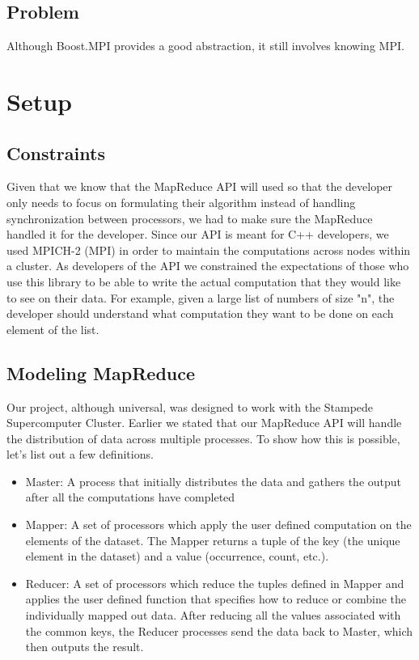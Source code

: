 \documentclass[11pt]{article}
\begin{document}
\subsection{Problem}
Although Boost.MPI provides a good abstraction, it still involves knowing MPI. 

\section{Setup}
\subsection{Constraints}
Given that we know that the MapReduce API will used so that the developer only needs to focus on formulating their algorithm instead of handling synchronization between processors, we had to make sure the MapReduce handled it for the developer. Since our API is meant for C++ developers, we used MPICH-2 (MPI) in order to maintain the computations across nodes within a cluster. As developers of the API we constrained the expectations of those who use this library to be able to write the actual computation that they would like to see on their data. For example, given a large list of numbers of size "n", the developer should understand what computation they want to be done on each element of the list. 
\subsection{Modeling MapReduce}
Our project, although universal, was designed to work with the Stampede Supercomputer Cluster. Earlier we stated that our MapReduce API will handle the distribution of data across multiple processes. To show how this is possible, let's list out a few definitions.
\begin{itemize}
  \item Master: A process that initially distributes the data and gathers the output after all the computations have completed
  \item Mapper: A set of processors which apply the user defined computation on the elements of the dataset. The Mapper returns a tuple of the key (the unique element in the dataset) and a value (occurrence, count, etc.).
  \item Reducer: A set of processors which reduce the tuples defined in Mapper and applies the user defined function that specifies how to reduce or combine the individually mapped out data. After reducing all the values associated with the common keys, the Reducer processes send the data back to Master, which then outputs the result.
\end{itemize}
\end{document}
